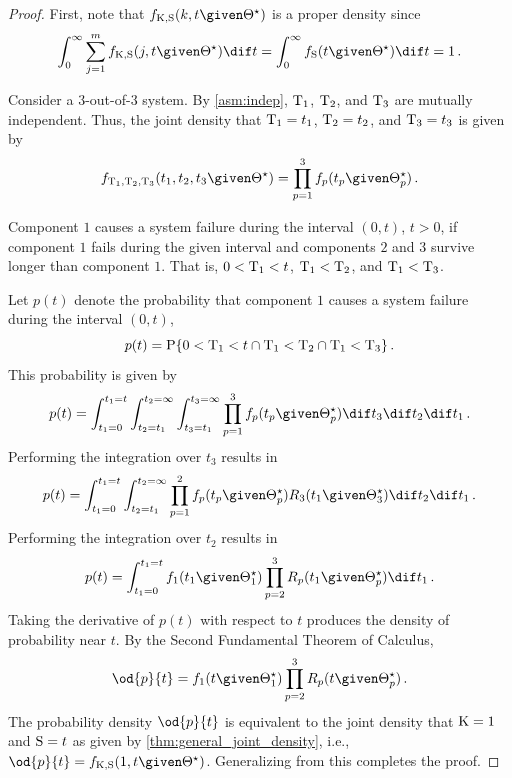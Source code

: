 \documentclass[../main.tex]{subfiles}
\begin{document}
\begin{proof}
First, note that $\pdf_{\RV{K}, \sv}(k, t \given \tparam\sysparam)$ is a proper density since
\begin{equation}
    \int_{0}^{\infty} \sum_{j=1}^{m} \pdf_{\RV{K}, \sv}(j, t \given \tparam\sysparam) \dif t = \int_{0}^{\infty} \spdf(t \given \tparam\sysparam) \dif t = 1\,.
\end{equation}

Consider a $3$-out-of-$3$ system. By \cref{asm:indep}, $\mathrm{T}_1$, $\mathrm{T}_2$, and $\mathrm{T}_3$ are mutually independent. Thus, the joint density that $\mathrm{T}_1 = t_1$, $\mathrm{T}_2 = t_2$, and $\mathrm{T}_3 = t_3$ is given by
\begin{equation}
    \pdf_{\cv_1, \cv_2, \cv_3}(t_1, t_2, t_3 \given \tparam\sysparam) =
        \prod_{p=1}^{3} \pdf_p(t_p \given \tparam{\sysparam}_p)\,.
\end{equation}

Component $1$ causes a system failure during the interval $(0, t)$, $t > 0$, if component $1$ fails during the given interval and components $2$ and $3$ survive longer than component $1$. That is, $0 < \mathrm{T}_1 < t$, $\mathrm{T}_1 < \mathrm{T}_2$, and $\mathrm{T}_1 < \mathrm{T}_3$.

Let $p(t)$ denote the probability that component $1$ causes a system failure during the interval $(0, t)$,
\begin{equation}
    p(t) = \mathrm{P}\{0 < \mathrm{T}_1 < t \cap \mathrm{T}_1 < \mathrm{T}_2 \cap \mathrm{T}_1 < \mathrm{T}_3\}\,.
\end{equation}
This probability is given by
\begin{equation}
    p(t) = \int_{t_1=0}^{t_1=t} \int_{t_2=t_1}^{t_2=\infty} \int_{t_3=t_1}^{t_3=\infty}
    \prod_{p=1}^{3} \pdf_p(t_p \given \tparam{\sysparam}_p) \dif t_3 \dif t_2 \dif t_1\,.
\end{equation}
Performing the integration over $t_3$ results in
\begin{equation}
    p(t) = \int_{t_1=0}^{t_1=t} \int_{t_2=t_1}^{t_2=\infty}
    \prod_{p=1}^{2} \pdf_p(t_p \given \tparam{\sysparam}_p)
    \srv_3(t_1 \given \tparam{\sysparam}_3) \dif t_2 \dif t_1\,.
\end{equation}
Performing the integration over $t_2$ results in
\begin{equation}
    p(t) = \int_{t_1=0}^{t_1=t} \pdf_1(t_1 \given \tparam{\sysparam}_1)
    \prod_{p=2}^{3} \srv_p(t_1 \given \tparam{\sysparam}_p) \dif t_1\,.
\end{equation}
Taking the derivative of $p(t)$ with respect to $t$ produces the density of probability near $t$. By the Second Fundamental Theorem of Calculus,
\begin{equation}
    \od{p}{t} = \pdf_1(t \given \tparam{\sysparam}_1) \prod_{p=2}^{3} \srv_p(t \given \tparam{\sysparam}_p)\,.
\end{equation}
The probability density $\od{p}{t}$ is equivalent to the joint density that $\mathrm{K} = 1$ and $\mathrm{S} = t$ as given by \cref{thm:general_joint_density}, i.e., $\od{p}{t} = \pdf_{\RV{K}, \sv}(1, t \given \tparam{\sysparam})$. Generalizing from this completes the proof.
\end{proof}
\end{document}
